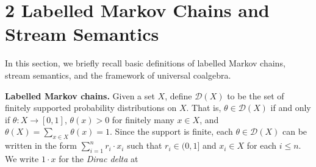 %
\hypertarget{html:S2}{} \section*{2 Labelled Markov Chains and Stream Semantics}
\hypertarget{html:S2.p1}{} In this section, we briefly recall basic definitions of labelled Markov chains, stream semantics, and the framework of universal coalgebra.
\par\medskip
\hypertarget{html:S2.SS0.SSS0.P0.SPx1}{} \par\noindent\textbf{Labelled Markov chains.}\quad  %
\hypertarget{html:S2.SS0.SSS0.P0.SPx1.p1}{} Given a set %
\hypertarget{html:S2.SS0.SSS0.P0.SPx1.p1.m1}{}\({X}\), define %
\hypertarget{html:S2.SS0.SSS0.P0.SPx1.p1.m2}{}\({{\mathcal{D}}(X)}\) to be the set of finitely supported probability distributions on %
\hypertarget{html:S2.SS0.SSS0.P0.SPx1.p1.m3}{}\({X}\). That is, %
\hypertarget{html:S2.SS0.SSS0.P0.SPx1.p1.m4}{}\({\theta\in{\mathcal{D}}(X)}\) if and only if %
\hypertarget{html:S2.SS0.SSS0.P0.SPx1.p1.m5}{}\({\theta\colon X\to[0,1]}\), %
\hypertarget{html:S2.SS0.SSS0.P0.SPx1.p1.m6}{}\({\theta(x)>0}\) for finitely many %
\hypertarget{html:S2.SS0.SSS0.P0.SPx1.p1.m7}{}\({x\in X}\), and %
\hypertarget{html:S2.SS0.SSS0.P0.SPx1.p1.m8}{}\({\theta(X)=\sum_{x\in X}\theta(x)=1}\). Since the support is finite, each %
\hypertarget{html:S2.SS0.SSS0.P0.SPx1.p1.m9}{}\({\theta\in{\mathcal{D}}(X)}\) can be written in the form %
\hypertarget{html:S2.SS0.SSS0.P0.SPx1.p1.m10}{}\({\sum_{i=1}^{n}r_{i}\cdot x_{i}}\) such that %
\hypertarget{html:S2.SS0.SSS0.P0.SPx1.p1.m11}{}\({r_{i}\in(0,1]}\) and %
\hypertarget{html:S2.SS0.SSS0.P0.SPx1.p1.m12}{}\({x_{i}\in X}\) for each %
\hypertarget{html:S2.SS0.SSS0.P0.SPx1.p1.m13}{}\({i\leq n}\). We write %
\hypertarget{html:S2.SS0.SSS0.P0.SPx1.p1.m14}{}\({1\cdot x}\) for the \emph{Dirac delta} at %
